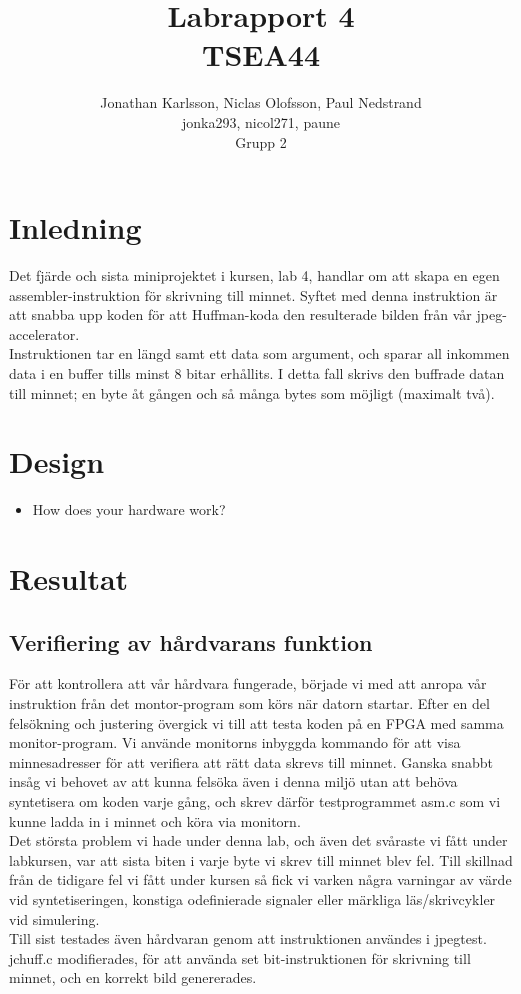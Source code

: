 \documentclass[a4paper]{article}
\author{Jonathan Karlsson, Niclas Olofsson, Paul Nedstrand\\jonka293, nicol271, paune\\Grupp 2}
\title{Labrapport 4\\ \vspace{2 mm} {\large TSEA44}}
\begin{document}
\maketitle

\section{Inledning}
Det fjärde och sista miniprojektet i kursen, lab 4, handlar om att skapa en egen assembler-instruktion
för skrivning till minnet. Syftet med denna instruktion är att snabba upp koden för att
Huffman-koda den resulterade bilden från vår jpeg-accelerator.\\
Instruktionen tar en längd samt ett data som argument, och sparar all inkommen data
i en buffer tills minst 8 bitar erhållits. I detta fall skrivs den buffrade datan till minnet;
en byte åt gången och så många bytes som möjligt (maximalt två).


\section{Design}
\begin{itemize}
\item How does your hardware work?
\end{itemize}

\section{Resultat}
\subsection{Verifiering av hårdvarans funktion}
För att kontrollera att vår hårdvara fungerade, började vi med att anropa vår instruktion från det
montor-program som körs när datorn startar. Efter en del felsökning och justering övergick vi till att testa
koden på en FPGA med samma monitor-program. Vi använde monitorns inbyggda kommando för att visa minnesadresser
för att verifiera att rätt data skrevs till minnet. Ganska snabbt insåg vi behovet av att kunna felsöka
även i denna miljö utan att behöva syntetisera om koden varje gång, och skrev därför testprogrammet asm.c
som vi kunne ladda in i minnet och köra via monitorn.\\
Det största problem vi hade under denna lab, och även det svåraste vi fått under labkursen,
var att sista biten i varje byte vi skrev till minnet blev fel. Till skillnad från de tidigare fel
vi fått under kursen så fick vi varken några varningar av värde vid syntetiseringen, konstiga
odefinierade signaler eller märkliga läs/skrivcykler vid simulering.\\
Till sist testades även hårdvaran genom att instruktionen användes i jpegtest. jchuff.c modifierades,
för att använda set bit-instruktionen för skrivning till minnet, och en korrekt bild genererades.
\end{document}
